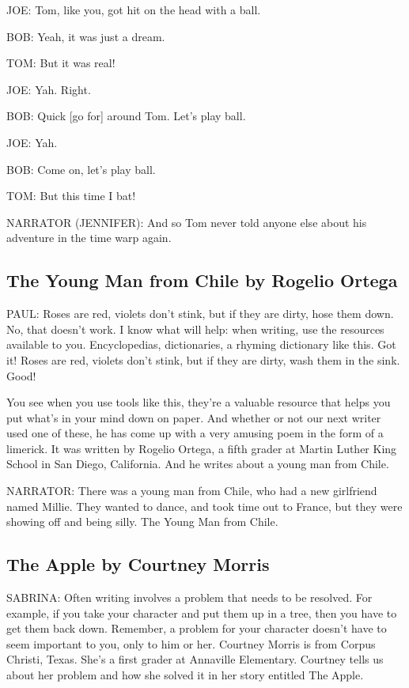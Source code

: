 JOE:
Tom, like you, got hit on the head with a ball.

BOB:
Yeah, it was just a dream.

TOM:
But it was real!

JOE:
Yah.
Right.

BOB:
Quick [go for] around Tom.
Let's play ball.

JOE:
Yah.

BOB:
Come on, let's play ball.

TOM:
But this time I bat!

NARRATOR (JENNIFER):
And so Tom never told anyone else about his adventure in the time warp again.

\subsection{The Young Man from Chile by Rogelio Ortega}

PAUL:
Roses are red, violets don't stink, but if they are dirty, hose them down.
No, that doesn't work.
I know what will help: when writing, use the resources available to you.
Encyclopedias, dictionaries, a rhyming dictionary like this.
Got it!
Roses are red, violets don't stink, but if they are dirty, wash them in the sink.
Good!

You see when you use tools like this, they're a valuable resource that helps you put what's in your mind down on paper.
And whether or not our next writer used one of these, he has come up with a very amusing poem in the form of a limerick.
It was written by Rogelio Ortega, a fifth grader at Martin Luther King School in San Diego, California.
And he writes about a young man from Chile.

NARRATOR:
There was a young man from Chile, who had a new girlfriend named Millie.
They wanted to dance, and took time out to France, but they were showing off and being silly.
The Young Man from Chile.

\subsection{The Apple by Courtney Morris}

SABRINA:
Often writing involves a problem that needs to be resolved.
For example, if you take your character and put them up in a tree, then you have to get them back down.
Remember, a problem for your character doesn't have to seem important to you, only to him or her.
Courtney Morris is from Corpus Christi, Texas.
She's a first grader at Annaville Elementary.
Courtney tells us about her problem and how she solved it in her story entitled The Apple.

